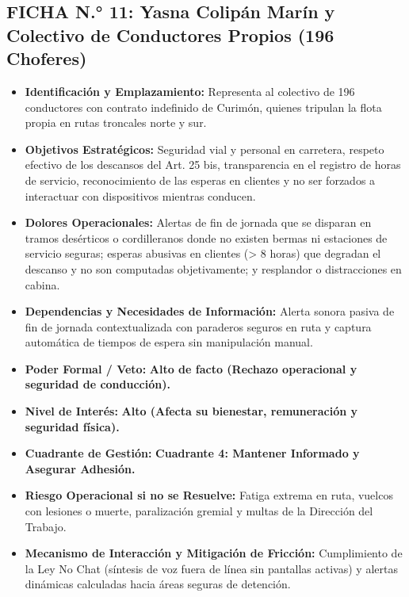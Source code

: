 \subsection*{FICHA N.° 11: Yasna Colipán Marín y Colectivo de Conductores Propios (196 Choferes)}
\begin{itemize}
\item \textbf{Identificación y Emplazamiento:} Representa al colectivo de 196 conductores con contrato indefinido de Curimón, quienes tripulan la flota propia en rutas troncales norte y sur.
\item \textbf{Objetivos Estratégicos:} Seguridad vial y personal en carretera, respeto efectivo de los descansos del Art. 25 bis, transparencia en el registro de horas de servicio, reconocimiento de las esperas en clientes y no ser forzados a interactuar con dispositivos mientras conducen.
\item \textbf{Dolores Operacionales:} Alertas de fin de jornada que se disparan en tramos desérticos o cordilleranos donde no existen bermas ni estaciones de servicio seguras; esperas abusivas en clientes (> 8 horas) que degradan el descanso y no son computadas objetivamente; y resplandor o distracciones en cabina.
\item \textbf{Dependencias y Necesidades de Información:} Alerta sonora pasiva de fin de jornada contextualizada con paraderos seguros en ruta y captura automática de tiempos de espera sin manipulación manual.
\item \textbf{Poder Formal / Veto:} \textbf{Alto de facto (Rechazo operacional y seguridad de conducción).}
\item \textbf{Nivel de Interés:} \textbf{Alto (Afecta su bienestar, remuneración y seguridad física).}
\item \textbf{Cuadrante de Gestión:} \textbf{Cuadrante 4: Mantener Informado y Asegurar Adhesión.}
\item \textbf{Riesgo Operacional si no se Resuelve:} Fatiga extrema en ruta, vuelcos con lesiones o muerte, paralización gremial y multas de la Dirección del Trabajo.
\item \textbf{Mecanismo de Interacción y Mitigación de Fricción:} Cumplimiento de la Ley No Chat (síntesis de voz fuera de línea sin pantallas activas) y alertas dinámicas calculadas hacia áreas seguras de detención.
\end{itemize}
